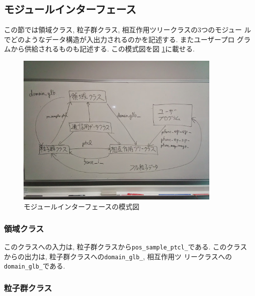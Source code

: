 \documentclass[12pt,a4paper]{jarticle}
\begin{document}
\subsection{モジュールインターフェース}
\label{sec:brief_interface}

この節では領域クラス, 粒子群クラス, 相互作用ツリークラスの3つのモジュー
ルでどのようなデータ構造が入出力されるのかを記述する. またユーザープロ
グラムから供給されるものも記述する. この模式図を図
\ref{fig:brief_interface}に載せる.

\begin{figure}
  \begin{center}
    \includegraphics[width=10cm,bb=0 0 600 500]{fig/brief_interface.jpg}
  \end{center}
  \caption{モジュールインターフェースの模式図}
  \label{fig:brief_interface}
\end{figure}

\subsubsection{領域クラス}
\label{sec:brief_interface_domain_info}


このクラスへの入力は, 粒子群クラスから{\tt pos\_sample\_ptcl\_}である.
このクラスからの出力は, 粒子群クラスへの{\tt domain\_glb\_}, 相互作用ツ
リークラスへの{\tt domain\_glb\_}である.

\subsubsection{粒子群クラス}
\label{sec:brief_interface_paricle_system}
\end{document}
